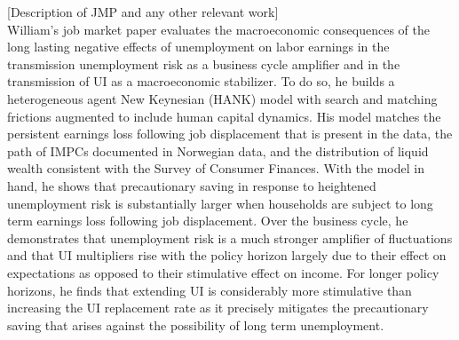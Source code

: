 \documentclass[\econtexRoot/Letter]{subfiles}
\begin{document}
\notinsubfile{\renewcommand{\econtexRoot}{.}}


[Description of JMP and any other relevant work] \\

William's job market paper evaluates the macroeconomic consequences of the long lasting negative effects of unemployment on labor earnings in the transmission unemployment risk as a business cycle amplifier and in the transmission of UI as a macroeconomic stabilizer. To do so, he builds a heterogeneous agent New Keynesian (HANK) model with search and matching frictions augmented to include human capital dynamics. His model matches the persistent earnings loss following job displacement that is present in the data, the path of IMPCs documented in Norwegian data, and the distribution of liquid wealth consistent with the Survey of Consumer Finances. With the model in hand, he shows that precautionary saving in response to heightened unemployment risk is substantially larger when households are subject to long term earnings loss following job displacement. Over the business cycle, he demonstrates that unemployment risk is a much stronger amplifier of fluctuations and that UI multipliers rise with the policy horizon largely due to their effect on expectations as opposed to their stimulative effect on income. For longer policy horizons, he finds that extending UI is considerably more stimulative than increasing the UI replacement rate as it precisely mitigates the precautionary saving that arises against the possibility of long term unemployment. 



\end{document}
